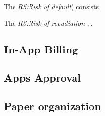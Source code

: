 \medskip

The {\em R5:Risk of default}) consists

\medskip

The {\em R6:Risk of repudiation} ...


\subsection{In-App Billing}



\subsection{Apps Approval}




\subsection{Paper organization}


